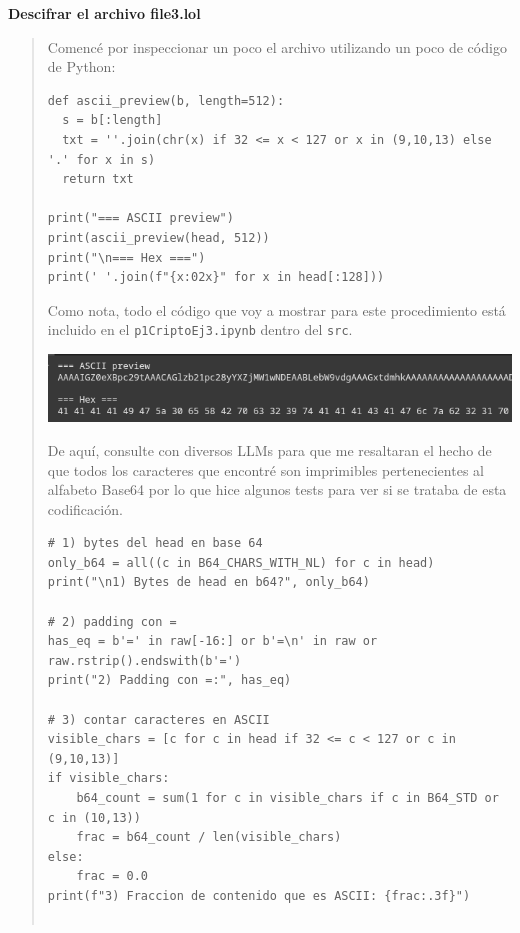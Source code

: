 \textbf{Descifrar el archivo file3.lol}

\begin{quote}
    Comencé por inspeccionar un poco el archivo utilizando un poco de código de Python:
    \vspace{.3cm}

    \begin{verbatim}
def ascii_preview(b, length=512):
  s = b[:length]
  txt = ''.join(chr(x) if 32 <= x < 127 or x in (9,10,13) else '.' for x in s)
  return txt

print("=== ASCII preview")
print(ascii_preview(head, 512))
print("\n=== Hex ===")
print(' '.join(f"{x:02x}" for x in head[:128]))
    \end{verbatim}
    \vspace{.3cm}

    Como nota, todo el código que voy a mostrar para este procedimiento está incluido en el \texttt{p1CriptoEj3.ipynb} dentro del \texttt{src}.

    \begin{center}
    	\includegraphics[width=.9\textwidth]{resources/ej3.png} 
    \end{center}

    De aquí, consulte con diversos LLMs para que me resaltaran el hecho de que todos los
    caracteres que encontré son imprimibles pertenecientes al alfabeto Base64 por lo que hice
    algunos tests para ver si se trataba de esta codificación. \vspace{.3cm}

    \begin{verbatim}
# 1) bytes del head en base 64
only_b64 = all((c in B64_CHARS_WITH_NL) for c in head)
print("\n1) Bytes de head en b64?", only_b64)

# 2) padding con =
has_eq = b'=' in raw[-16:] or b'=\n' in raw or raw.rstrip().endswith(b'=')
print("2) Padding con =:", has_eq)

# 3) contar caracteres en ASCII
visible_chars = [c for c in head if 32 <= c < 127 or c in (9,10,13)]
if visible_chars:
    b64_count = sum(1 for c in visible_chars if c in B64_STD or c in (10,13))
    frac = b64_count / len(visible_chars)
else:
    frac = 0.0
print(f"3) Fraccion de contenido que es ASCII: {frac:.3f}")


\end{verbatim}
\end{quote}

